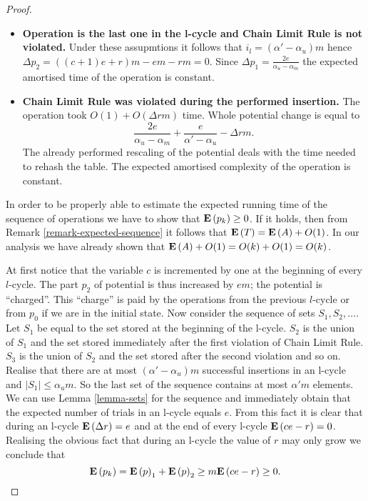 \documentclass[runningheads,a4paper]{llncs}
\begin{document}
\begin{proof}
\begin{itemize}
\item \textbf{Operation is the last one in the l-cycle and Chain Limit Rule is not violated.} Under these assupmtions it follows that $i_l = (\alpha' - \alpha_u)m$ hence $\Delta p_2 = ((c + 1)e + r)m - em - rm = 0$. Since $\Delta p_1 = \frac{2e}{\alpha_u - \alpha_m}$ the expected amortised time of the operation is constant.

\item \textbf{Chain Limit Rule was violated during the performed insertion.}
The operation took $O(1) + O(\Delta r m)$ time. Whole potential change is equal to \[ \frac{2e}{\alpha_u - \alpha_m} + \frac{e}{\alpha' - \alpha_u} - \Delta r m .\] The already performed rescaling of the potential deals with the time needed to rehash the table. The expected amortised complexity of the operation is constant.
\end{itemize}

In order to be properly able to estimate the expected running time of the sequence of operations we have to show that $\mathbf{E}\left(p_k\right) \geq 0$. If it holds, then from Remark \ref{remark-expected-sequence} it follows that $\mathbf{E}\left(T\right) = \mathbf{E}\left(A\right) + O(1)$. In our analysis we have already shown that $\mathbf{E}\left(A\right) + O(1) = O(k) + O(1) = O(k)$. 

At first notice that the variable $c$ is incremented by one at the beginning of every $l$-cycle. The part $p_2$ of potential is thus increased by $em$; the potential is ``charged''. This ``charge'' is paid by the operations from the previous $l$-cycle or from $p_0$ if we are in the initial state. Now consider the sequence of sets $S_1, S_2, \dots$. Let $S_1$ be equal to the set stored at the beginning of the l-cycle. $S_2$ is the union of $S_1$ and the set stored immediately after the first violation of Chain Limit Rule. $S_3$ is the union of $S_2$ and the set stored after the second violation and so on. Realise that there are at most $(\alpha' - \alpha_u)m$ successful insertions in an l-cycle and $|S_1| \leq \alpha_u m$. So the last set of the sequence contains at most $\alpha'm$ elements. We can use Lemma \ref{lemma-sets} for the sequence and immediately obtain that the expected number of trials in an l-cycle equals $e$. From this fact it is clear that during an l-cycle $\mathbf{E}\left(\Delta r\right) = e$ and at the end of every l-cycle $\mathbf{E}\left(ce - r\right) = 0$. Realising the obvious fact that during an l-cycle the value of $r$ may only grow we conclude that
\[
\mathbf{E}\left(p_k\right) = \mathbf{E}\left(p\right)_1 + \mathbf{E}\left(p\right)_2 \geq m\mathbf{E}\left(ce - r\right) \geq 0.
\]
\end{proof}
\end{document}
